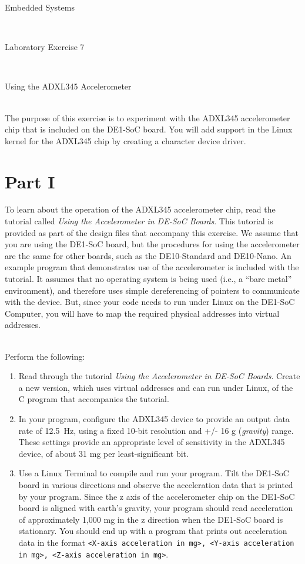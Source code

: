 \documentclass[epsfig,10pt,fullpage]{article}
\newcommand{\LabNum}{7}
\begin{document}
\centerline{\huge Embedded Systems}
~\\
\centerline{\huge Laboratory Exercise \LabNum}
~\\
\centerline{\large Using the ADXL345 Accelerometer}
~\\

\noindent
The purpose of this exercise is to experiment with the ADXL345 accelerometer chip that is
included on the DE1-SoC board. You will add support in the Linux kernel for the ADXL345 chip 
by creating a character device driver.

\noindent
\section*{Part I}

\noindent
To learn about the operation of the ADXL345 accelerometer chip, read the tutorial called
{\it Using the Accelerometer in DE-SoC Boards}. This tutorial is provided as part of the 
design files that accompany this exercise. We assume that you are using the DE1-SoC board,
but the procedures for using the accelerometer are the same for other boards, such as the
DE10-Standard and DE10-Nano.  An example program that demonstrates use of the accelerometer
is included with the tutorial.  It assumes that no operating system is
being used (i.e., a ``bare metal'' environment), and therefore uses simple dereferencing of 
pointers to communicate with the device. But, since your code needs to run under Linux on the
DE1-SoC Computer, you will have to map the required physical addresses into virtual
addresses.

~\\
\noindent
Perform the following:

\begin{enumerate}
\item Read through the tutorial {\it Using the Accelerometer in DE-SoC Boards}. Create a new
version, which uses virtual addresses and can run under Linux, of the C program that accompanies 
the tutorial.
\item In your program, configure the ADXL345 device to provide an output data rate of 12.5~Hz,
using a fixed 10-bit resolution and +/- 16 g ({\it gravity}) range. 
These settings provide an appropriate
level of sensitivity in the ADXL345 device, of about 31 mg per least-significant bit.
\item Use a Linux Terminal to compile and run your program. Tilt the DE1-SoC board in various
directions and observe the acceleration data that is printed by your program. Since the z axis
of the accelerometer chip on the DE1-SoC board is aligned with earth's gravity, your program
should read acceleration of approximately 1,000 mg in the z direction when the DE1-SoC board
is stationary. You should end up with a program that prints out acceleration data in the format 
\texttt{<X-axis acceleration in mg>, <Y-axis acceleration in mg>, <Z-axis acceleration in mg>}.
\end{enumerate}
\end{document}
